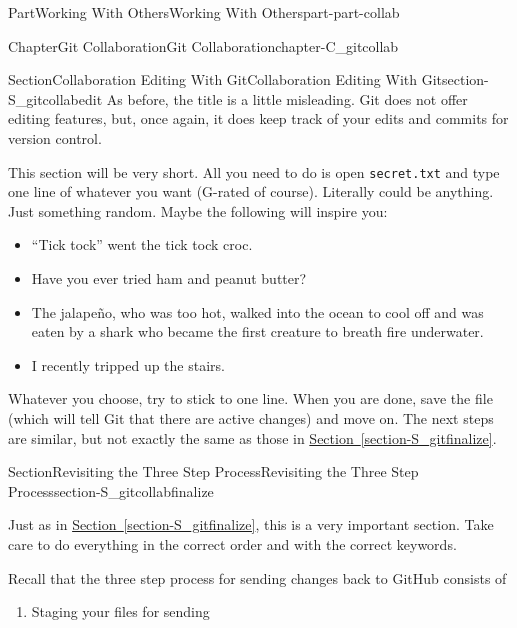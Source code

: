 \documentclass[oneside,10pt,]{book}
\newcommand{\xreffont}{\relax}
\newcommand{\mono}[1]{\texttt{#1}}
\begin{document}
\begin{partptx}{Part}{Working With Others}{}{Working With Others}{}{}{part-part-collab}
\begin{chapterptx}{Chapter}{Git Collaboration}{}{Git Collaboration}{}{}{chapter-C_gitcollab}
\typeout{************************************************}
%
\begin{sectionptx}{Section}{Collaboration Editing With Git}{}{Collaboration Editing With Git}{}{}{section-S_gitcollabedit}
%
%
As before, the title is a little misleading. Git does not offer editing features, but, once again, it does keep track of your edits and commits for version control.%
\par
This section will be very short. All you need to do is open \mono{secret.txt} and type one line of whatever you want (G-rated of course). Literally could be anything. Just something random. Maybe the following will inspire you:%
\begin{itemize}[label=\textbullet]
\item{}``Tick tock'' went the tick tock croc.%
\item{}Have you ever tried ham and peanut butter?%
\item{}The jalapeño, who was too hot, walked into the ocean to cool off and was eaten by a shark who became the first creature to breath fire underwater.%
\item{}I recently tripped up the stairs.%
\end{itemize}
%
\par
Whatever you choose, try to stick to one line. When you are done, save the file (which will tell Git that there are active changes) and move on. The next steps are similar, but not exactly the same as those in \hyperref[section-S_gitfinalize]{Section~{\xreffont\ref{section-S_gitfinalize}}}.%
\end{sectionptx}
%
%
\typeout{************************************************}
\typeout{************************************************}
%
\begin{sectionptx}{Section}{Revisiting the Three Step Process}{}{Revisiting the Three Step Process}{}{}{section-S_gitcollabfinalize}
%
%
\begin{introduction}{}%
Just as in \hyperref[section-S_gitfinalize]{Section~{\xreffont\ref{section-S_gitfinalize}}}, this is a very important section. Take care to do everything in the correct order and with the correct keywords.%
\par
Recall that the three step process for sending changes back to GitHub consists of%
\begin{enumerate}
\item{}Staging your files for sending%

\end{enumerate}
\end{introduction}
\end{sectionptx}
\end{chapterptx}
\end{partptx}
\end{document}
